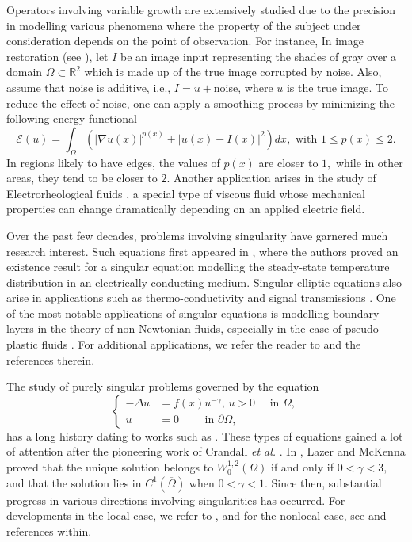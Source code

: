 \documentclass[11pt]{article}
\newcommand{\pa} {\partial}
\newcommand{\ga} {\gamma}
\newcommand{\om} {\Omega}
\newcommand{\De} {\Delta}
\newcommand{\oline} {\overline}
\newcommand{\real}{\mathbb{R}}
\newcommand{\grad}{\nabla}
\begin{document}
Operators involving variable growth are extensively studied due 
to the precision in modelling various phenomena where the 
property of the subject under consideration 
depends on the point of observation.
For instance,
In image restoration 
(see \cite{Image_restore}),
let
$I$
be an image input representing the shades of gray over a domain
$\om \subset \real^2$
which is made up of the true image corrupted by noise.
Also, assume that noise is additive, i.e.,
$I = u +$noise, where
$u$
is the true image.
To reduce the effect of noise, one can apply a 
smoothing process by minimizing the following 
energy functional
\begin{equation*}
    \mathcal{E}(u) = 
\int_{\om} ( |\grad u(x)|^{p(x)} + |u(x) - I(x)|^2 )dx,
 \text{ with } 1 \leq p(x) \leq 2.
\end{equation*}
In regions likely to have edges, the values of
$p(x)$
are closer to
$1,$
while in other areas, they tend to be closer to
$2$.
Another application arises in the study of 
Electrorheological fluids
\cite{ruzicka2007electrorheological}, 
a special type of viscous fluid whose 
mechanical properties can change dramatically 
depending on an applied electric field.

Over the past few decades, problems involving 
singularity have garnered much research interest.
Such equations first appeared in
\cite{fulks}, where the authors proved an 
existence result for a singular equation 
modelling the steady-state temperature 
distribution in an electrically conducting medium.
Singular elliptic equations also arise in 
applications such as thermo-conductivity
\cite{fulks} and signal transmissions
\cite{signal}.
One of the most notable applications of 
singular equations is modelling boundary 
layers in the theory of non-Newtonian fluids, 
especially in the case of pseudo-plastic fluids
\cite{pseudo}.
For additional applications, 
we refer the reader to
\cite{Singular_book,sing_review} 
and the references therein.

 The study of purely singular problems 
 governed by the equation
 	\begin{equation*}
   \left\{
	\begin{aligned}
		-\De u&=f(x)u^{-\gamma},\, u>0 
		\quad  \text{ in } \om,\\
		u &= 0 \qquad \text{ in } \pa\om,
	\end{aligned}
    \right.
\end{equation*}
 has a long history dating to works such as
\cite{fulks,stuart}.
These types of equations gained a lot of 
attention after the pioneering work of Crandall 
\textit{et al.}
\cite{crandaal}.
In
\cite{mckenna}, Lazer and McKenna proved that 
the unique solution belongs to
$W_0^{1,2}(\om)$
if and only if
$0<\ga<3,$
and that the solution lies in
$C^1(\oline\om)$
when
$0<\ga<1.$
Since then, substantial progress in various 
directions involving singularities has occurred.
For developments in the local case, we refer to
\cite{boccado2010, coclite, lair2, zhang2004}, 
and for the nonlocal case, see
\cite{Arora_nonlocal, CANINO_2017,Giacomoni_2019_nonlocal} 
and references within.
\end{document}
